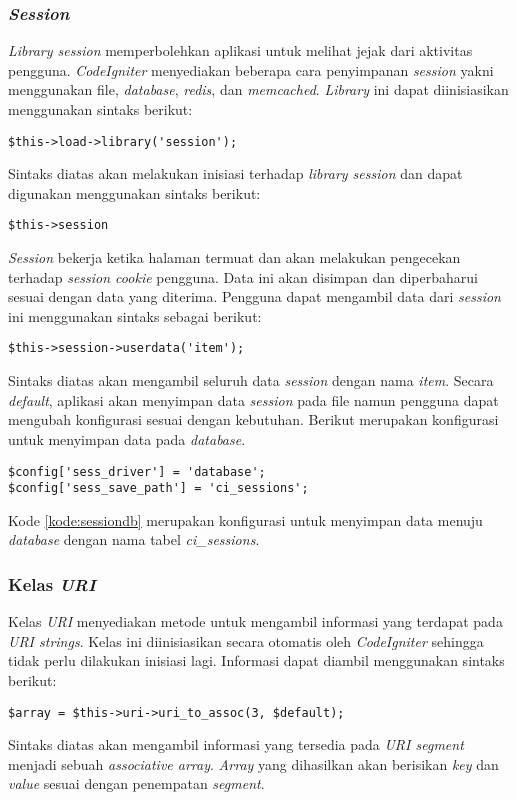 \subsubsection{\textit{Session}}
\textit{Library session} memperbolehkan aplikasi untuk melihat jejak dari aktivitas pengguna. \textit{CodeIgniter} menyediakan beberapa cara penyimpanan \textit{session} yakni menggunakan file, \textit{database}, \textit{redis}, dan \textit{memcached}. \textit{Library} ini dapat diinisiasikan menggunakan sintaks berikut:
\begin{center}
	\verb|$this->load->library('session');|
\end{center}
Sintaks diatas akan melakukan inisiasi terhadap \textit{library session} dan dapat digunakan menggunakan sintaks berikut:
\begin{center}
	\verb|$this->session|
\end{center}
\textit{Session} bekerja ketika halaman termuat dan akan melakukan pengecekan terhadap \textit{session cookie} pengguna. Data ini akan disimpan dan diperbaharui sesuai dengan  data yang diterima. Pengguna dapat mengambil data dari \textit{session} ini menggunakan sintaks sebagai berikut:
\begin{center}
	\verb|$this->session->userdata('item');|
\end{center}
Sintaks diatas akan mengambil seluruh data \textit{session} dengan nama \textit{item}. Secara \textit{default}, aplikasi akan menyimpan data \textit{session} pada file namun pengguna dapat mengubah konfigurasi sesuai dengan kebutuhan. Berikut merupakan konfigurasi untuk menyimpan data pada \textit{database}.
\begin{lstlisting}[caption=Contoh konfiguras untuk menyimpan data pada \textit{database}, label=kode:sessiondb]
$config['sess_driver'] = 'database';
$config['sess_save_path'] = 'ci_sessions';
\end{lstlisting}
Kode \ref{kode:sessiondb} merupakan konfigurasi untuk menyimpan data menuju \textit{database} dengan nama tabel \textit{ci\_sessions}.

\subsubsection{Kelas \textit{URI}}
Kelas \textit{URI} menyediakan metode untuk mengambil informasi yang terdapat pada \textit{URI strings}. Kelas ini diinisiasikan secara otomatis oleh \textit{CodeIgniter} sehingga tidak perlu dilakukan inisiasi lagi. Informasi dapat diambil menggunakan sintaks berikut:
\begin{center}
	\verb|$array = $this->uri->uri_to_assoc(3, $default);|
\end{center}
Sintaks diatas akan mengambil informasi yang tersedia pada \textit{URI segment} menjadi sebuah \textit{associative array}. \textit{Array} yang dihasilkan akan berisikan \textit{key} dan \textit{value} sesuai dengan penempatan \textit{segment}.

